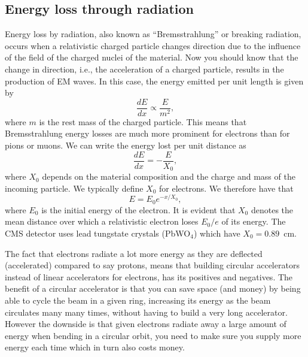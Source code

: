 

\subsection{Energy loss through radiation}
Energy loss by radiation, also known as ``Bremsstrahlung'' or breaking radiation, occurs when a relativistic charged particle changes direction due to the influence of the field of the charged nuclei of the material. Now you should know that the change in direction, i.e., the acceleration of a charged particle, results in the production of EM waves. In this case, the energy emitted per unit length is given by
\begin{equation}
\frac{dE}{dx}\propto \frac{E}{m^2},
\end{equation}
where $m$ is the rest mass of the charged particle. This means that Bremsstrahlung energy losses are much more prominent for electrons than for pions or muons. We can write the energy lost per unit distance as
\begin{equation}
\frac{dE}{dx}=-\frac{E}{X_{0}},
\end{equation}
where $X_0$ depends on the material composition and the charge and mass of the incoming particle. We typically define $X_0$ for electrons. We therefore have that
\begin{equation}
E=E_0e^{-x/X_0},
\end{equation}
where $E_0$ is the initial energy of the electron.
It is evident that $X_0$ denotes the mean distance over which a relativistic electron loses $E_0/e$ of its energy. The CMS detector uses lead tungstate crystals (PbWO$_4$) which have $X_0=0.89$~cm.

The fact that electrons radiate a lot more energy as they are deflected (accelerated) compared to say protons, means that building circular accelerators instead of linear accelerators for electrons, has its positives and negatives. The benefit of a circular accelerator is that you can save space (and money) by being able to cycle the beam in a given ring, increasing its energy as the beam circulates many many times, without having to build a very long accelerator. However the downside is that given electrons radiate away a large amount of energy when bending in a circular orbit, you need to make sure you supply more energy each time which in turn also costs money.

